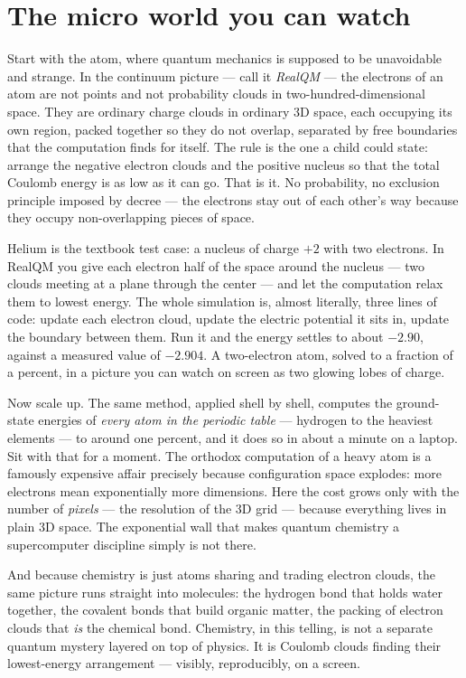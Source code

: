 \documentclass[11pt]{article}
\begin{document}
\section*{The micro world you can watch}

Start with the atom, where quantum mechanics is supposed to be unavoidable and strange. In the
continuum picture --- call it \emph{RealQM} --- the electrons of an atom are not points and not
probability clouds in two-hundred-dimensional space. They are ordinary charge clouds in ordinary
3D space, each occupying its own region, packed together so they do not overlap, separated by free
boundaries that the computation finds for itself. The rule is the one a child could state: arrange
the negative electron clouds and the positive nucleus so that the total Coulomb energy is as low as
it can go. That is it. No probability, no exclusion principle imposed by decree --- the electrons
stay out of each other's way because they occupy non-overlapping pieces of space.

Helium is the textbook test case: a nucleus of charge $+2$ with two electrons. In RealQM you give
each electron half of the space around the nucleus --- two clouds meeting at a plane through the
center --- and let the computation relax them to lowest energy. The whole simulation is, almost
literally, three lines of code: update each electron cloud, update the electric potential it sits
in, update the boundary between them. Run it and the energy settles to about $-2.90$, against a
measured value of $-2.904$. A two-electron atom, solved to a fraction of a percent, in a picture
you can watch on screen as two glowing lobes of charge.

Now scale up. The same method, applied shell by shell, computes the ground-state energies of
\emph{every atom in the periodic table} --- hydrogen to the heaviest elements --- to around one
percent, and it does so in about a minute on a laptop. Sit with that for a moment. The orthodox
computation of a heavy atom is a famously expensive affair precisely because configuration space
explodes: more electrons mean exponentially more dimensions. Here the cost grows only with the
number of \emph{pixels} --- the resolution of the 3D grid --- because everything lives in plain 3D
space. The exponential wall that makes quantum chemistry a supercomputer discipline simply is not
there.

And because chemistry is just atoms sharing and trading electron clouds, the same picture runs
straight into molecules: the hydrogen bond that holds water together, the covalent bonds that
build organic matter, the packing of electron clouds that \emph{is} the chemical bond. Chemistry,
in this telling, is not a separate quantum mystery layered on top of physics. It is Coulomb clouds
finding their lowest-energy arrangement --- visibly, reproducibly, on a screen.
\end{document}
